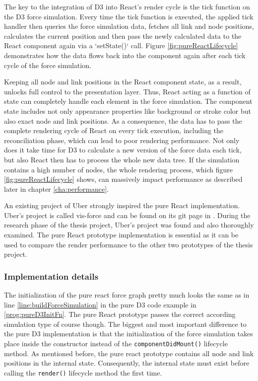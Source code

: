 The key to the integration of D3 into React's render cycle is the tick function on the D3 force simulation. Every time the tick function is executed, the applied tick handler then queries the force simulation data, fetches all link and node positions, calculates the current position and then pass the newly calculated data to the React component again via a `setState()` call. Figure \ref{fig:pureReactLifecycle} demonstrates how the data flows back into the component again after each tick cycle of the force simulation.

Keeping all node and link positions in the React component state, as a result, unlocks full control to the presentation layer. Thus, React acting as a function of state can completely handle each element in the force simulation. The component state includes not only appearance properties like background or stroke color but also exact node and link positions. As a consequence, the data has to pass the complete rendering cycle of React on every tick execution, including the reconciliation phase, which can lead to poor rendering performance. Not only does it take time for D3 to calculate a new version of the force data each tick, but also React then has to process the whole new data tree. If the simulation contains a high number of nodes, the whole rendering process, which figure \ref{fig:pureReactLifecycle} shows, can massively impact performance as described later in chapter \ref{cha:performance}.

An existing project of Uber strongly inspired the pure React implementation. Uber's project is called vis-force and can be found on its git page in \cite{UberVisForce}. During the research phase of the thesis project, Uber's project was found and also thoroughly examined. The pure React prototype implementation is essential as it can be used to compare the render performance to the other two prototypes of the thesis project.

\subsubsection{Implementation details}

The initialization of the pure react force graph pretty much looks the same as in line \ref{line:buildForceSimulation} in the pure D3 code example in \ref{prog:pureD3InitFn}. The pure React prototype passes the correct according simulation type of course though. The biggest and most important difference to the pure D3 implementation is that the initialization of the force simulation takes place inside the constructor instead of the \texttt{componentDidMount()} lifecycle method. As mentioned before, the pure react prototype contains all node and link positions in the internal state. Consequently, the internal state must exist before calling the \texttt{render()} lifecycle method the first time.

